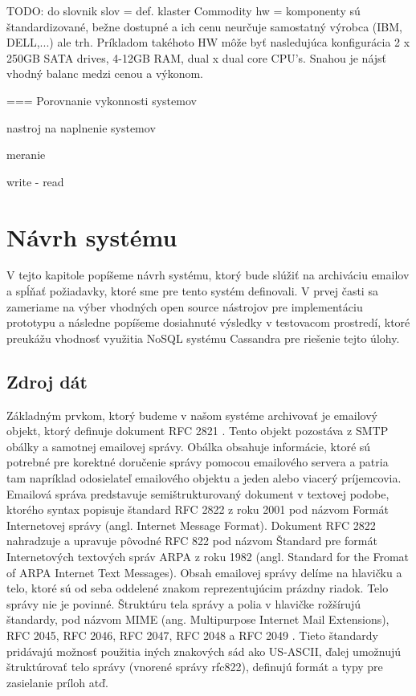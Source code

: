\documentclass[11pt,twoside,a4paper]{book}
\begin{document}
TODO: do slovnik slov = def. klaster
Commodity hw = komponenty sú štandardizované, bežne dostupné a ich cenu neurčuje samostatný výrobca (IBM, DELL,...) ale trh. Príkladom takéhoto HW môže byť nasledujúca konfigurácia 2 x 250GB SATA drives, 4-12GB RAM, dual x dual core CPU's. Snahou je nájsť vhodný balanc medzi cenou a výkonom.

=== Porovnanie vykonnosti systemov 

nastroj na naplnenie systemov 

meranie 

write - read 




\chapter{Návrh systému}

V tejto kapitole popíšeme návrh systému, ktorý bude slúžiť na archiváciu emailov a spĺňať požiadavky, ktoré sme pre tento systém definovali. V prvej časti sa zameriame na výber vhodných open source nástrojov pre implementáciu prototypu a následne popíšeme dosiahnuté výsledky v testovacom prostredí, ktoré preukážu vhodnosť využitia NoSQL systému Cassandra pre riešenie tejto úlohy.

\section{Zdroj dát}
Základným prvkom, ktorý budeme v našom systéme archivovať je emailový objekt, ktorý definuje dokument RFC 2821 \cite{}. Tento objekt pozostáva z SMTP obálky a samotnej emailovej správy. Obálka obsahuje informácie, ktoré sú potrebné pre korektné doručenie správy pomocou emailového servera a patria tam napríklad odosielateľ emailového objektu a jeden alebo viacerý príjemcovia. Emailová správa predstavuje semištrukturovaný dokument \cite{Udell} v textovej podobe, ktorého syntax popisuje štandard RFC 2822 \cite{Resnick:2001:IMF:RFC2822} z roku 2001 pod názvom Formát Internetovej správy (angl. Internet Message Format). Dokument RFC 2822 nahradzuje a upravuje pôvodné RFC 822 pod názvom Štandard pre formát Internetových textových správ ARPA z roku 1982 (angl. Standard for the Fromat of ARPA Internet Text Messages). Obsah emailovej správy delíme na hlavičku a telo, ktoré sú od seba oddelené znakom reprezentujúcim prázdny riadok. Telo správy nie je povinné. Štruktúru tela správy a polia v hlavičke rožšírujú štandardy, pod názvom MIME (ang. Multipurpose Internet Mail Extensions), RFC 2045, RFC 2046, RFC 2047, RFC 2048 a RFC 2049 \cite{}. Tieto štandardy pridávajú možnosť použitia iných znakových sád ako US-ASCII, ďalej umožnujú štruktúrovať telo správy (vnorené správy rfc822), definujú formát a typy pre zasielanie príloh atď.
\end{document}
